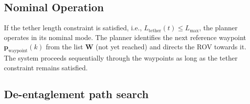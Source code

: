 \subsection{Nominal Operation}
If the tether length constraint is satisfied, i.e., \( L_{\text{tether}}(t) \leq L_{\text{max}} \), the planner operates in its nominal mode. The planner identifies the next reference waypoint \( \mathbf{p}_{\text{waypoint}}(k) \) from the list \( \mathbf{W} \) (not yet reached) and directs the \ac{ROV} towards it. The system proceeds sequentially through the waypoints as long as the tether constraint remains satisfied.



\subsection{De-entaglement path search}


